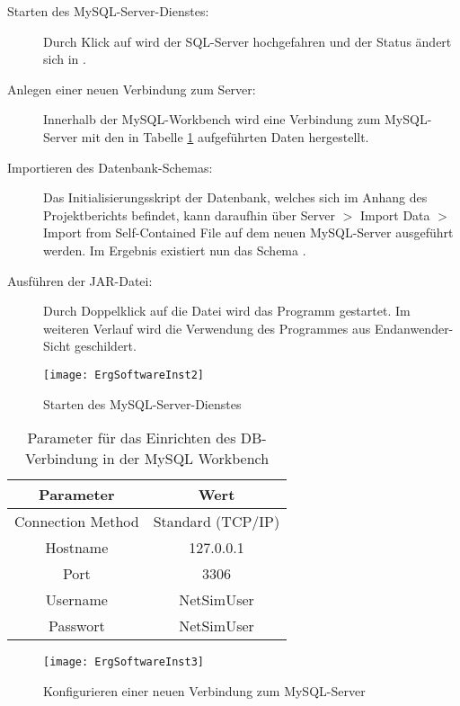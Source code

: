 \begin{description}
\item [Starten des MySQL-Server-Dienstes:]
Durch Klick auf  wird der SQL-Server hochgefahren und der Status ändert sich in .

\item [Anlegen einer neuen Verbindung zum Server:]
Innerhalb der MySQL-Workbench wird eine Verbindung zum MySQL-Server mit den in Tabelle \ref{tab:mysql} aufgeführten Daten hergestellt.

\item [Importieren des Datenbank-Schemas:] Das Initialisierungsskript der Datenbank, welches sich im Anhang des Projektberichts befindet, kann daraufhin über Server $ > $ Import Data $ > $ Import from Self-Contained File auf dem neuen MySQL-Server ausgeführt werden. Im Ergebnis existiert nun das Schema .

\item [Ausführen der JAR-Datei:] Durch Doppelklick auf die Datei  wird das Programm gestartet. Im weiteren Verlauf wird die Verwendung des Programmes aus Endanwender-Sicht geschildert.
\end{description}

\begin{figure}[htb]
	\centering
	\texttt{[image: ErgSoftwareInst2]}
	\caption{Starten des MySQL-Server-Dienstes}
	\label{fig:ErgSoftwareInst2}
\end{figure}

\begin{table}[htb]
\centering
\caption{Parameter für das Einrichten des DB-Verbindung in der MySQL Workbench}
\label{tab:mysql}
	 \begin{tabular}{cc}
	\textbf{Parameter} & \textbf{Wert}\\
	\hline
	\hline
	Connection Method & Standard (TCP/IP)\\
	 \hline
	Hostname & 127.0.0.1\\
	 \hline
	Port & 3306\\
	 \hline
	Username & NetSimUser\\
	 \hline
	Passwort & NetSimUser\\
	 \end{tabular}
\end{table}
\begin{figure}[ht]
	\centering
	\texttt{[image: ErgSoftwareInst3]}
	\caption{Konfigurieren einer neuen Verbindung zum MySQL-Server}
	\label{fig:ErgSoftwareInst3}
\end{figure}

